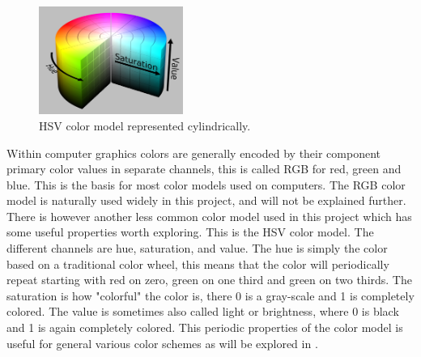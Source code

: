 
\begin{figure}
    \begin{center}
        \includegraphics[width=0.42\textwidth]{fig/hsv_illustration}
    \end{center}
    \caption{HSV color model represented cylindrically.}
\end{figure}

Within computer graphics colors are generally encoded by their component primary color values in separate channels, this is called RGB for red, green and blue. This is the basis for most color models used on computers. The RGB color model is naturally used widely in this project, and will not be explained further. There is however another less common color model used in this project which has some useful properties worth exploring. 
This is the HSV color model. The different channels are hue, saturation, and value. The hue is simply the color based on a traditional color wheel, this means that the color will periodically repeat starting with red on zero, green on one third and green on two thirds. The saturation is how "colorful" the color is, there 0 is a gray-scale and 1 is completely colored. The value is sometimes also called light or brightness, where 0 is black and 1 is again completely colored. This periodic properties of the color model is useful for general various color schemes as will be explored in .








